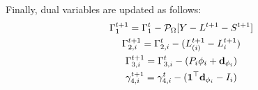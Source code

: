 \documentclass{article}
\begin{document}
Finally, dual variables are updated as follows:
\begin{gather}
    \Gamma_1^{t+1} = \Gamma_1^{t} - \mathcal{P}_{\Omega}[Y-L^{t+1}-S^{t+1}] \\
    \Gamma_{2,i}^{t+1} = \Gamma_{2,i}^{t} - (L_{(i)}^{t+1}-L_i^{t+1}) \\
    \Gamma_{3,i}^{t+1} = \Gamma_{3,i}^{t} - (P_i\phi_i+\mathbf{d}_{\phi_i}) \\
    \gamma_{4,i}^{t+1} = \gamma_{4,i}^{t} - (\mathbf{1}^\top \mathbf{d}_{\phi_i}-I_i)
\end{gather}



% 
% 
\end{document}
